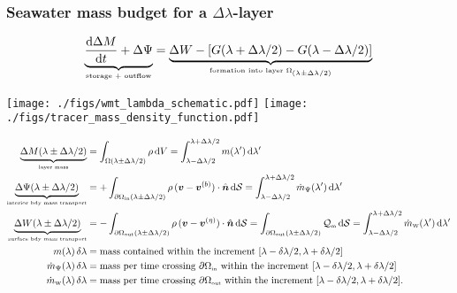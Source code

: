 \documentclass[10pt]{beamer}
\begin{document}
\begin{frame}
  \frametitle{Seawater mass budget for a $\Delta \lambda$-layer}

\scriptsize 
\begin{exampleblock}{}

\begin{equation*}
 \underbrace{ \frac{\mathrm{d} \Delta M}{\mathrm{d}  t} + \Delta \Psi}_{\mbox{\tiny storage + outflow}}
 = \underbrace{ \Delta W 
 -[ G(\lambda + \Delta \lambda/2) - G(\lambda - \Delta \lambda/2) ]
  }_{\mbox{\tiny formation into layer $\Omega_{(\lambda \pm \Delta \lambda/2)}$}}
\end{equation*}

\tiny 
\end{exampleblock}
\begin{center}
{\texttt{[image: ./figs/wmt\_lambda\_schematic.pdf]}}
\hspace{.5cm}
{\texttt{[image: ./figs/tracer\_mass\_density\_function.pdf]}}
 \end{center}

\tiny 

\begin{align*}
 \underbrace{\Delta M(\lambda \pm \Delta \lambda/2)}_{\mbox{\tiny layer mass}}
 &= \int_{\Omega(\lambda \pm \Delta \lambda/2)} \rho \, \mathrm{d}V 
   =  \int_{\lambda - \Delta \lambda/2}^{\lambda + \Delta \lambda/2}  m(\lambda') \, \mathrm{d}\lambda'
\\
 \underbrace{\Delta \Psi(\lambda \pm \Delta \lambda/2)}_{\mbox{\tiny interior bdy mass transport}}
 &= +\int_{\partial \Omega_{\mbox{\tiny in}}(\lambda \pm \Delta \lambda/2)} \rho \,
 ({\bm v} - {\bm v}^{(b)}) \cdot \hat{\bm n} \, \mathrm{d}\mathcal{S}
= \int_{\lambda - \Delta \lambda/2}^{\lambda + \Delta \lambda/2} 
    \dot{m}_{\Psi}(\lambda') \, \mathrm{d}\lambda'
\\
 \underbrace{\Delta W(\lambda \pm \Delta \lambda/2)}_{\mbox{\tiny surface bdy mass transport}}
&=
-\int_{\partial \Omega_{\mbox{\tiny out}}(\lambda \pm \Delta \lambda/2)} \rho \,
 ({\bm v} - {\bm v}^{(\eta)}) \cdot \hat{\bm n} \, \mathrm{d}\mathcal{S}
 =
 \int_{\partial \Omega_{\mbox{\tiny out}}(\lambda \pm \Delta \lambda/2)} 
 \mathcal{Q}_{\mbox{\tiny m}} \, \mathrm{d}\mathcal{S}
= \int_{\lambda - \Delta \lambda/2}^{\lambda + \Delta \lambda/2} 
    \dot{m}_{\mbox{\tiny W}}(\lambda') \, \mathrm{d}\lambda'
\\
 m (\lambda) \, \delta \lambda 
&= \mbox{mass contained within the increment $[\lambda-\delta \lambda/2, \lambda+\delta \lambda/2]$}
\\
\dot{m}_{\Psi}(\lambda) \, \delta \lambda 
&= \mbox{mass per time crossing  
$\partial \Omega_{\mbox{\tiny in}}$ 
 within the increment $[\lambda-\delta \lambda/2, \lambda+\delta \lambda/2]$}
\\
 \dot{m}_{\mbox{\tiny W}}(\lambda)   \, \delta \lambda 
&= \mbox{mass per time crossing $\partial \Omega_{\mbox{\tiny out}}$ 
 within the increment $[\lambda-\delta \lambda/2, \lambda+\delta \lambda/2]$.}
\end{align*}   

\end{frame}
\end{document}
